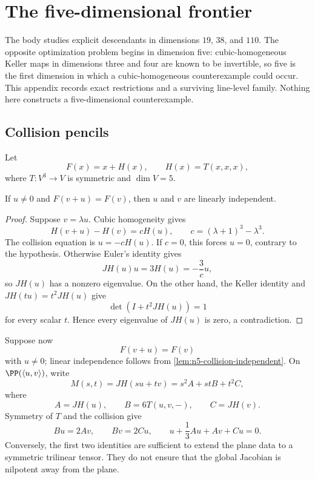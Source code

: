 \section{The five-dimensional frontier}
\label{app:dimension-five}

The body studies explicit descendants in dimensions \(19\), \(38\), and
\(110\).  The opposite optimization problem begins in dimension five:
cubic-homogeneous Keller maps in dimensions three and four are known to be
invertible, so five is the first dimension in which a cubic-homogeneous
counterexample could occur.  This appendix records exact restrictions and a
surviving line-level family.  Nothing here constructs a five-dimensional
counterexample.

\subsection{Collision pencils}

Let
\[
F(x)=x+H(x),\qquad H(x)=T(x,x,x),
\]
where \(T\colon V^3\to V\) is symmetric and \(\dim V=5\).

\begin{lemma}
\label{lem:n5-collision-independent}
If \(u\ne0\) and \(F(v+u)=F(v)\), then \(u\) and \(v\) are linearly
independent.
\end{lemma}

\begin{proof}
Suppose \(v=\lambda u\).  Cubic homogeneity gives
\[
 H(v+u)-H(v)=cH(u),\qquad
 c=(\lambda+1)^3-\lambda^3.
\]
The collision equation is \(u=-cH(u)\).  If \(c=0\), this forces \(u=0\),
contrary to the hypothesis.  Otherwise Euler's identity gives
\[
 JH(u)u=3H(u)=-\frac3c u,
\]
so \(JH(u)\) has a nonzero eigenvalue.  On the other hand, the Keller
identity and \(JH(tu)=t^2JH(u)\) give
\[
 \det(I+t^2JH(u))=1
\]
for every scalar \(t\).  Hence every eigenvalue of \(JH(u)\) is zero, a
contradiction.
\end{proof}

Suppose now
\[
F(v+u)=F(v)
\]
with \(u\ne0\); linear independence follows from
\cref{lem:n5-collision-independent}.  On
\(\PP(\langle u,v\rangle)\), write
\[
M(s,t)=JH(su+tv)=s^2A+stB+t^2C,
\]
where
\[
A=JH(u),\qquad B=6T(u,v,-),\qquad C=JH(v).
\]
Symmetry of \(T\) and the collision give
\begin{equation}
\label{eq:n5-plane-equations}
Bu=2Av,\qquad Bv=2Cu,\qquad
u+\frac13Au+Av+Cu=0.
\end{equation}
Conversely, the first two identities are sufficient to extend the plane
data to a symmetric trilinear tensor.  They do not ensure that the global
Jacobian is nilpotent away from the plane.

